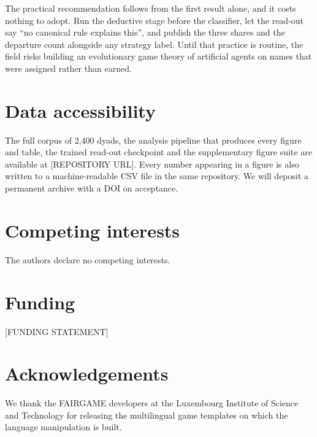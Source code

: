 \documentclass[11pt,a4paper]{article}
\begin{document}
The practical recommendation follows from the first result alone, and it costs
nothing to adopt. Run the deductive stage before the classifier, let the
read-out say ``no canonical rule explains this'', and publish the three shares
and the departure count alongside any strategy label. Until that practice is
routine, the field risks building an evolutionary game theory of artificial
agents on names that were assigned rather than earned.

\section*{Data accessibility}
The full corpus of 2{,}400 dyads, the analysis pipeline that produces every
figure and table, the trained read-out checkpoint and the supplementary figure
suite are available at [REPOSITORY URL]. Every number appearing in a figure is
also written to a machine-readable CSV file in the same repository. We will
deposit a permanent archive with a DOI on acceptance.

\section*{Competing interests}
The authors declare no competing interests.

\section*{Funding}
[FUNDING STATEMENT]

\section*{Acknowledgements}
We thank the FAIRGAME developers at the Luxembourg Institute of Science and
Technology for releasing the multilingual game templates on which the language
manipulation is built.



\end{document}
